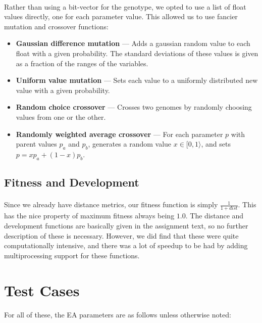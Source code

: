 \documentclass[a4paper,12pt]{article}
\begin{document}
\paragraph{}Rather than using a bit-vector for the genotype, we opted to use a list of float values directly, one for each parameter value. This allowed us to use fancier mutation and crossover functions:
\begin{itemize}
\item{\textbf{Gaussian difference mutation} --- Adds a gaussian random value to each float with a given probability. The standard deviations of these values is given as a fraction of the ranges of the variables.}
\item{\textbf{Uniform value mutation} --- Sets each value to a uniformly distributed new value with a given probability.}
\item{\textbf{Random choice crossover} --- Crosses two genomes by randomly choosing values from one or the other.}
\item{\textbf{Randomly weighted average crossover} --- For each parameter $p$ with parent values $p_a$ and $p_b$, generates a random value $x \in [ 0, 1 \rangle$, and sets $p = x p_a + (1-x)p_b$.}
\end{itemize}

\subsection{Fitness and Development}

\paragraph{}Since we already have distance metrics, our fitness function is simply $\frac{1}{1+dist}$. This has the nice property of maximum fitness always being $1.0$. The distance and development functions are basically given in the assignment text, so no further description of these is necessary. However, we did find that these were quite computationally intensive, and there was a lot of speedup to be had by adding multiprocessing support for these functions.

\section{Test Cases}

\paragraph{}For all of these, the EA parameters are as follows unless otherwise noted: \\
\end{document}
